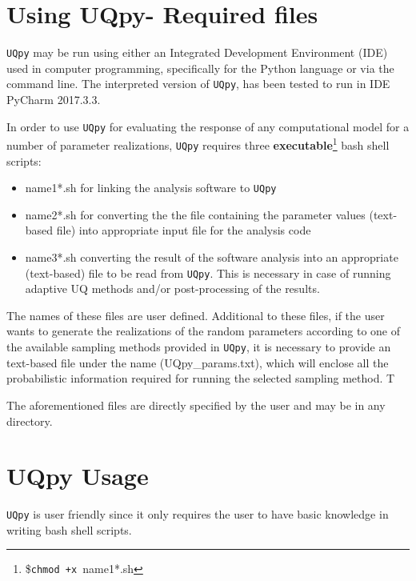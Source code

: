 \section{Using UQpy- Required files}

\noindent
\texttt{UQpy} may be run using either an Integrated Development Environment (IDE) used in computer programming, specifically for the Python language or via the command line. The interpreted version of \texttt{UQpy}, has been tested to run in IDE PyCharm 2017.3.3.

In order to use  \texttt{UQpy} for evaluating the response of any computational model for a number of parameter realizations,  \texttt{UQpy}  requires three \textbf{executable}\footnote{\$\texttt{chmod +x }{\color{red}name1*.sh} } bash shell scripts: 

\begin{itemize}
\item {\color{red}name1*.sh} for linking the analysis software to \texttt{UQpy} 

\item {\color{red}name2*.sh} for converting the the file containing the parameter values (text-based file) into appropriate input file for the analysis code  

\item {\color{red}name3*.sh} converting the result of the software analysis into an appropriate  (text-based) file to be read from \texttt{UQpy}. This is necessary  in case of running adaptive UQ methods and/or post-processing of the results. 
\end{itemize}

\noindent
The names of these files are user defined. Additional to these files, if the user wants to  generate the realizations of the random parameters according to one of the  available sampling methods  provided in \texttt{UQpy}, it is necessary to provide an text-based file under the name  ({\color{magenta}UQpy\_params.txt}), which will enclose all the probabilistic information required for running the selected sampling method. T

The aforementioned files are directly specified by the user and may be in any directory.


\section{UQpy Usage}

\noindent
\texttt{UQpy} is user friendly since it only requires the user to have basic knowledge in writing bash shell scripts.

